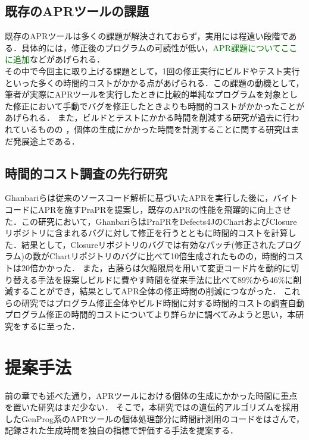 \documentclass[uplatex,dvipdfmx,a4paper]{jsarticle}
\newcommand{\TODO}[1]{{\textcolor{green}{#1}}}
\let\oldcite\cite
\renewcommand{\cite}[1]{\xspace\oldcite{#1}}
\begin{document}
\subsection{既存のAPRツールの課題} \label{sec:prev_challenge}
既存のAPRツールは多くの課題が解決されておらず\cite{le2013current}，実用には程遠い段階である．具体的には，修正後のプログラムの可読性が低い\cite{smith2015cure}，\TODO{APR課題についてここに追加}などがあげられる．\\
その中で今回主に取り上げる課題として，1回の修正実行にビルドやテスト実行といった多くの時間的コストがかかる点\cite{chen2017contract}があげられる．この課題の動機として，筆者が実際にAPRツールを実行したときに比較的単純なプログラムを対象とした修正において手動でバグを修正したときよりも時間的コストがかかったことがあげられる．
また，ビルドとテストにかかる時間を削減する研究が過去に行われているものの\cite{id692}
，個体の生成にかかった時間を計測することに関する研究はまだ発展途上である．
\subsection{時間的コスト調査の先行研究}
Ghanbari\cite{ghanbari2019practical}らは従来のソースコード解析に基づいたAPRを実行した後に，バイトコードにAPRを施すPraPRを提案し，既存のAPRの性能を飛躍的に向上させた．この研究において，GhanbariらはPraPRをDefects4JのChartおよびClosureリポジトリに含まれるバグに対して修正を行うとともに時間的コストを計算した．結果として，Closureリポジトリのバグでは有効なパッチ(修正されたプログラム)の数がChartリポジトリのバグに比べて10倍生成されたものの，時間的コストは20倍かかった．
また，古藤\cite{id692}らは欠陥限局を用いて変更コード片を動的に切り替える手法を提案しビルドに費やす時間を従来手法に比べて89\%から46\%に削減することができ，結果としてAPR全体の修正時間の削減につながった．
これらの研究ではプログラム修正全体やビルド時間に対する時間的コストの調査自動プログラム修正の時間的コストについてより詳らかに調べてみようと思い，本研究をするに至った．
\clearpage
\section{提案手法} \label{sec:sgst}
前の章でも述べた通り，APRツールにおける個体の生成にかかった時間に重点を置いた研究はまだ少ない．
そこで，本研究ではの遺伝的アルゴリズムを採用したGenProg\cite{le2011genprog}系のAPRツールの個体処理部分に時間計測用のコードをはさんで，記録された生成時間を独自の指標で評価する手法を提案する．
\clearpage
\end{document}
